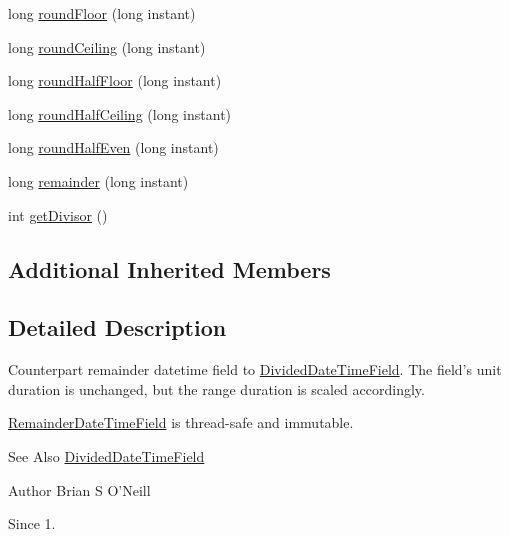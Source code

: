 \begin{DoxyCompactItemize}
long \hyperlink{classorg_1_1joda_1_1time_1_1field_1_1_remainder_date_time_field_abb13f870c07e593a156e45f6797f8c61}{round\-Floor} (long instant)
\item 
long \hyperlink{classorg_1_1joda_1_1time_1_1field_1_1_remainder_date_time_field_aa47aa210fe4801b1ab3c361278a618c8}{round\-Ceiling} (long instant)
\item 
long \hyperlink{classorg_1_1joda_1_1time_1_1field_1_1_remainder_date_time_field_a6910b9b5dc16cb941036433a81572d68}{round\-Half\-Floor} (long instant)
\item 
long \hyperlink{classorg_1_1joda_1_1time_1_1field_1_1_remainder_date_time_field_a1e0186156401b45fc603a3d6b1eaf2bb}{round\-Half\-Ceiling} (long instant)
\item 
long \hyperlink{classorg_1_1joda_1_1time_1_1field_1_1_remainder_date_time_field_afc59bc5399e4e348051ce55aea8b0ba4}{round\-Half\-Even} (long instant)
\item 
long \hyperlink{classorg_1_1joda_1_1time_1_1field_1_1_remainder_date_time_field_a6074d69034f1c038e21456060063e314}{remainder} (long instant)
\item 
int \hyperlink{classorg_1_1joda_1_1time_1_1field_1_1_remainder_date_time_field_a9aa99a8a14a8b93c3304a592a7f717aa}{get\-Divisor} ()
\end{DoxyCompactItemize}
\subsection*{Additional Inherited Members}


\subsection{Detailed Description}
Counterpart remainder datetime field to \hyperlink{classorg_1_1joda_1_1time_1_1field_1_1_divided_date_time_field}{Divided\-Date\-Time\-Field}. The field's unit duration is unchanged, but the range duration is scaled accordingly. 

\hyperlink{classorg_1_1joda_1_1time_1_1field_1_1_remainder_date_time_field}{Remainder\-Date\-Time\-Field} is thread-\/safe and immutable.

\begin{DoxySeeAlso}{See Also}
\hyperlink{classorg_1_1joda_1_1time_1_1field_1_1_divided_date_time_field}{Divided\-Date\-Time\-Field}
\end{DoxySeeAlso}
\begin{DoxyAuthor}{Author}
Brian S O'Neill 
\end{DoxyAuthor}
\begin{DoxySince}{Since}
1. 
\end{DoxySince}



